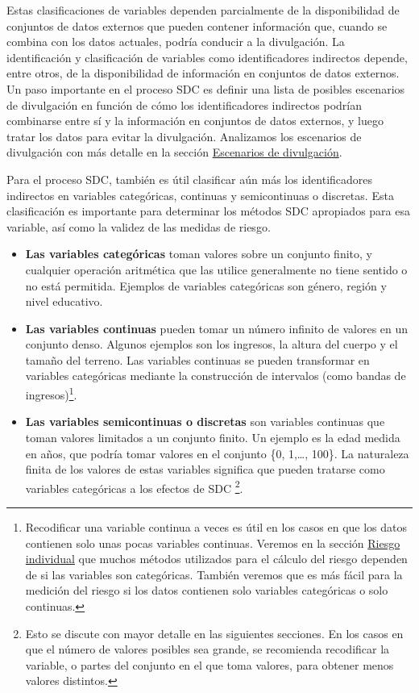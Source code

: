 \documentclass[]{book}
\theoremstyle{definition}
\theoremstyle{definition}
\theoremstyle{definition}
\theoremstyle{definition}
\theoremstyle{remark}
\begin{document}
Estas clasificaciones de variables dependen parcialmente de la disponibilidad de conjuntos de datos externos que pueden contener información que, cuando se combina con los datos actuales, podría conducir a la divulgación. La identificación y clasificación de variables como identificadores indirectos depende, entre otros, de la disponibilidad de información en conjuntos de datos externos. Un paso importante en el proceso SDC es definir una lista de posibles escenarios de divulgación en función de cómo los identificadores indirectos podrían combinarse entre sí y la información en conjuntos de datos externos, y luego tratar los datos para evitar la divulgación. Analizamos los escenarios de divulgación con más detalle en la sección \protect\hyperlink{escenarios-de-divulgaciuxf3n}{Escenarios de divulgación}.

Para el proceso SDC, también es útil clasificar aún más los identificadores indirectos en variables categóricas, continuas y semicontinuas o discretas. Esta clasificación es importante para determinar los métodos SDC apropiados para esa variable, así como la validez de las medidas de riesgo.

\begin{itemize}
\item
  \textbf{Las variables categóricas} toman valores sobre un conjunto finito, y cualquier operación aritmética que las utilice generalmente no tiene sentido o no está permitida. Ejemplos de variables categóricas son género, región y nivel educativo.
\item
  \textbf{Las variables continuas} pueden tomar un número infinito de valores en un conjunto denso. Algunos ejemplos son los ingresos, la altura del cuerpo y el tamaño del terreno. Las variables continuas se pueden transformar en variables categóricas mediante la construcción de intervalos (como bandas de ingresos)\footnote{Recodificar una variable continua a veces es útil en los casos en que los datos contienen solo unas pocas variables continuas. Veremos en la sección \protect\hyperlink{riesgo-individual}{Riesgo individual} que muchos métodos utilizados para el cálculo del riesgo dependen de si las variables son categóricas. También veremos que es más fácil para la medición del riesgo si los datos contienen solo variables categóricas o solo continuas.}.
\item
  \textbf{Las variables semicontinuas o discretas} son variables continuas que toman valores limitados a un conjunto finito. Un ejemplo es la edad medida en años, que podría tomar valores en el conjunto \{0, 1,\ldots{}, 100\}. La naturaleza finita de los valores de estas variables significa que pueden tratarse como variables categóricas a los efectos de SDC \footnote{Esto se discute con mayor detalle en las siguientes secciones. En los casos en que el número de valores posibles sea grande, se recomienda recodificar la variable, o partes del conjunto en el que toma valores, para obtener menos valores distintos.}.
\end{itemize}
\end{document}
